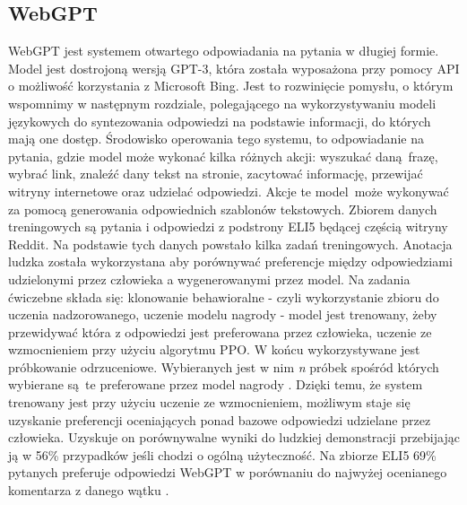 \subsection{WebGPT}

WebGPT jest systemem otwartego odpowiadania na pytania w długiej formie. Model jest dostrojoną wersją GPT-3, która została wyposażona przy pomocy API o możliwość korzystania z Microsoft Bing. Jest to rozwinięcie pomysłu, o którym wspomnimy w następnym rozdziale, polegającego na wykorzystywaniu modeli językowych do syntezowania odpowiedzi na podstawie informacji, do których mają one dostęp. Środowisko operowania tego systemu, to odpowiadanie na pytania, gdzie model może wykonać kilka różnych akcji: wyszukać daną frazę, wybrać link, znaleźć dany tekst na stronie, zacytować informację, przewijać witryny internetowe oraz udzielać odpowiedzi. Akcje te model może wykonywać za pomocą generowania odpowiednich szablonów tekstowych. Zbiorem danych treningowych są pytania i odpowiedzi z podstrony ELI5 będącej częścią witryny Reddit. Na podstawie tych danych powstało kilka zadań treningowych. Anotacja ludzka została wykorzystana aby porównywać preferencje między odpowiedziami udzielonymi przez człowieka a wygenerowanymi przez model. Na zadania ćwiczebne składa się: klonowanie behawioralne - czyli wykorzystanie zbioru do uczenia nadzorowanego, uczenie modelu nagrody - model jest trenowany, żeby przewidywać która z odpowiedzi jest preferowana przez człowieka, uczenie ze wzmocnieniem przy użyciu algorytmu PPO. W końcu wykorzystywane jest próbkowanie odrzuceniowe. Wybieranych jest w nim \emph{n} próbek spośród których wybierane są te preferowane przez model nagrody \autocite{nakano2021webgpt}. Dzięki temu, że system trenowany jest przy użyciu uczenie ze wzmocnieniem, możliwym staje się uzyskanie preferencji oceniających ponad bazowe odpowiedzi udzielane przez człowieka. Uzyskuje on porównywalne wyniki do ludzkiej demonstracji przebijając ją w 56\% przypadków jeśli chodzi o ogólną użyteczność. Na zbiorze ELI5 69\% pytanych preferuje odpowiedzi WebGPT w porównaniu do najwyżej ocenianego komentarza z danego wątku \autocite{nakano2021webgpt}.


